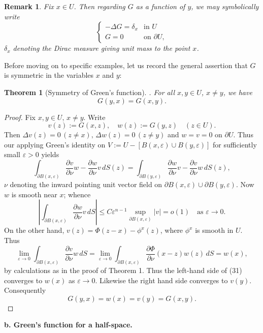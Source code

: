 \documentclass[a4paper,12pt]{report}
\newtheorem{theorem}{Theorem}[section]
\newtheorem{remark}{Remark}[section]
\begin{document}
\begin{remark}
Fix \( x \in U \). Then regarding \( G \) as a function of \( y \), we may symbolically write
\[
\begin{cases}
-\Delta G = \delta_x & \text{in } U \\
G = 0 & \text{on } \partial U,
\end{cases}
\]
\(\delta_x\) denoting the Dirac measure giving unit mass to the point \( x \).
\end{remark}
Before moving on to specific examples, let us record the general assertion that \( G \) is symmetric in the variables \( x \) and \( y \):
\begin{theorem}[Symmetry of Green’s function]. For all \( x, y \in U \), \( x \neq y \), we have
\[
G(y, x) = G(x, y).
\]
\end{theorem}
\begin{proof}
Fix \( x, y \in U, \, x \neq y \). Write
\[
v(z) := G(x, z), \quad w(z) := G(y, z) \quad (z \in U).
\]
Then \( \Delta v(z) = 0 \, (z \neq x), \, \Delta w(z) = 0 \, (z \neq y) \) and \( w = v = 0 \) on \( \partial U \). Thus our applying Green’s identity on \( V := U - [B(x, \varepsilon) \cup B(y, \varepsilon)] \) for sufficiently small \( \varepsilon > 0 \) yields
\[
\int_{\partial B(x, \varepsilon)} \frac{\partial v}{\partial \nu} w - \frac{\partial w}{\partial \nu} v \, dS(z) = \int_{\partial B(y, \varepsilon)} \frac{\partial w}{\partial \nu} v - \frac{\partial v}{\partial \nu} w \, dS(z), \tag{31}
\]
\(\nu\) denoting the inward pointing unit vector field on \( \partial B(x, \varepsilon) \cup \partial B(y, \varepsilon) \). Now \( w \) is smooth near \( x \); whence
\[
\left| \int_{\partial B(x, \varepsilon)} \frac{\partial w}{\partial \nu} v \, dS \right| \leq C \varepsilon^{n-1} \sup_{\partial B(x, \varepsilon)} |v| = o(1) \quad \text{as } \varepsilon \to 0.
\]
On the other hand, \( v(z) = \Phi(z - x) - \phi^x(z) \), where \( \phi^x \) is smooth in \( U \). Thus
\[
\lim_{\varepsilon \to 0} \int_{\partial B(x, \varepsilon)} \frac{\partial v}{\partial \nu} w \, dS = \lim_{\varepsilon \to 0} \int_{\partial B(x, \varepsilon)} \frac{\partial \Phi}{\partial \nu} (x - z) w(z) \, dS = w(x),
\]
by calculations as in the proof of Theorem 1. Thus the left-hand side of (31) converges to \( w(x) \) as \( \varepsilon \to 0 \). Likewise the right hand side converges to \( v(y) \). Consequently
\[
G(y, x) = w(x) = v(y) = G(x, y).
\]
\end{proof}

\noindent
\textbf{b. Green’s function for a half-space.}
\end{document}
